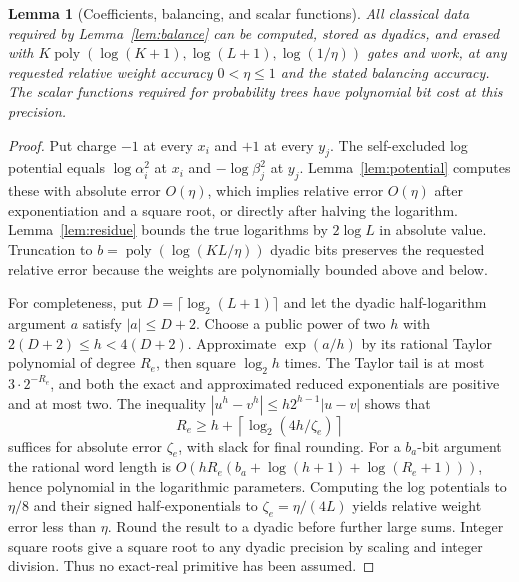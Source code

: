 \documentclass[11pt]{article}
\newtheorem{lemma}[theorem]{Lemma}
\theoremstyle{definition}
\newcommand{\poly}{\operatorname{poly}}
\begin{document}
\begin{lemma}[Coefficients, balancing, and scalar functions]\label{lem:arithmetic}
All classical data required by Lemma~\ref{lem:balance} can be computed,
stored as dyadics, and erased with
$K\poly(\log(K+1),\log(L+1),\log(1/\eta))$ gates and work, at any
requested relative weight accuracy $0<\eta\le1$ and the stated balancing
accuracy. The scalar functions required for probability trees have
polynomial bit cost at this precision.
\end{lemma}
\begin{proof}
Put charge $-1$ at every $x_i$ and $+1$ at every $y_j$. The self-excluded
log potential equals $\log\alpha_i^2$ at $x_i$ and
$-\log\beta_j^2$ at $y_j$. Lemma~\ref{lem:potential} computes these with
absolute error $O(\eta)$, which implies relative error $O(\eta)$ after
exponentiation and a square root, or directly after halving the logarithm.
Lemma~\ref{lem:residue} bounds the true logarithms by $2\log L$ in
absolute value. Truncation to $b=\poly(\log(KL/\eta))$ dyadic bits preserves
the requested relative error because the weights are polynomially bounded
above and below.

For completeness, put $D=\lceil\log_2(L+1)\rceil$ and let the dyadic
half-logarithm argument $a$ satisfy $|a|\le D+2$. Choose a public power
of two $h$ with $2(D+2)\le h<4(D+2)$. Approximate $\exp(a/h)$ by its
rational Taylor polynomial of degree $R_e$, then square $\log_2h$ times.
The Taylor tail is at most $3\cdot2^{-R_e}$, and both the exact and
approximated reduced exponentials are positive and at most two.
The inequality $|u^h-v^h|\le h2^{h-1}|u-v|$ shows that
\[
 R_e\ge h+\left\lceil\log_2(4h/\zeta_e)\right\rceil
\]
suffices for absolute error $\zeta_e$, with slack for final rounding.
For a $b_a$-bit argument the rational word length is
$O(hR_e(b_a+\log(h+1)+\log(R_e+1)))$, hence polynomial in the logarithmic
parameters. Computing the log potentials to $\eta/8$ and their signed
half-exponentials to $\zeta_e=\eta/(4L)$ yields relative weight error
less than $\eta$. Round the result to a dyadic before further large sums.
Integer square
roots give a square root to any dyadic precision by scaling and integer
division. Thus no exact-real primitive has been assumed.


\end{proof}
\end{document}

